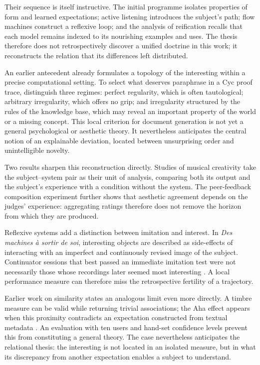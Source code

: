 \documentclass[11pt,a4paper]{article}
\begin{document}
Their sequence is itself instructive. The initial programme isolates properties
of form and learned expectations; active listening introduces the subject's
path; flow machines construct a reflexive loop; and the analysis of reification
recalls that each model remains indexed to its nourishing examples and uses. The
thesis therefore does not retrospectively discover a unified doctrine in this
work; it reconstructs the relation that its differences left distributed.

An earlier antecedent already formulates a topology of the interesting within a
precise computational setting. To select what deserves paraphrase in a Cyc proof
trace, \textcite{milipachet1995regularity} distinguish three regimes: perfect
regularity, which is often tautological; arbitrary irregularity, which offers no
grip; and irregularity structured by the rules of the knowledge base, which may
reveal an important property of the world or a missing concept. This local
criterion for document generation is not yet a general psychological or
aesthetic theory. It nevertheless anticipates the central notion of an
explainable deviation, located between unsurprising order and unintelligible
novelty.

Two results sharpen this reconstruction directly. Studies of musical creativity
take the subject--system pair as their unit of analysis, comparing both its output
and the subject's experience with a condition without the system. The peer-feedback
composition experiment further shows that aesthetic agreement depends on the judges'
experience: aggregating ratings therefore does not remove the horizon from which they
are produced.

Reflexive systems add a distinction between imitation and interest. In
\emph{Des machines à sortir de soi}, interesting objects are described as
side-effects of interacting with an imperfect and continuously revised image of
the subject. Continuator sessions that best passed an immediate imitation test
were not necessarily those whose recordings later seemed most interesting
\parencite{pachet2008machines}. A local performance measure can therefore miss
the retrospective fertility of a trajectory.

Earlier work on similarity states an analogous limit even more directly. A
timbre measure can be valid while returning trivial associations; the Aha effect
appears when this proximity contradicts an expectation constructed from textual
metadata \parencite{aucouturier2002similarity}. An evaluation with ten users and
hand-set confidence levels prevent this from constituting a general theory. The
case nevertheless anticipates the relational thesis: the interesting is not
located in an isolated measure, but in what its discrepancy from another
expectation enables a subject to understand.
\end{document}
